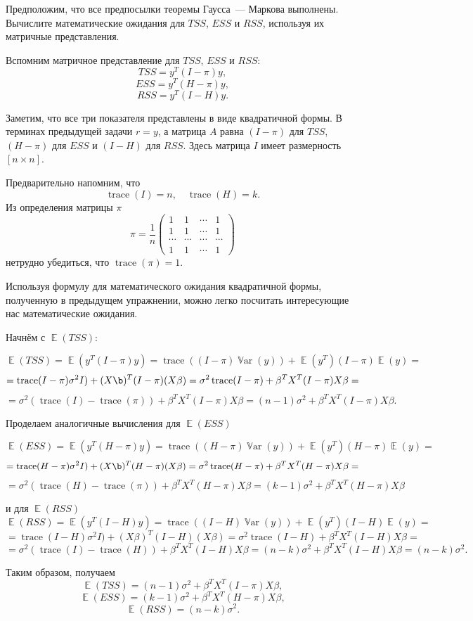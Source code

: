 \documentclass[12pt]{article}
\DeclareMathOperator{\Var}{\mathbb{V}ar}
\DeclareMathOperator{\E}{\mathbb{E}}
\DeclareMathOperator{\trace}{trace}
\newcommand{\RSS}{RSS}
\newcommand{\ESS}{ESS}
\newcommand{\TSS}{TSS}
\begin{document}
\begin{problem}
Предположим, что все предпосылки теоремы Гаусса~— Маркова выполнены. 
Вычислите математические ожидания для $\TSS$, $\ESS$ и $\RSS$, используя их матричные представления.
\begin{sol}
    Вспомним матричное представление для $\TSS$, $\ESS$ и $\RSS$:
    \[
\TSS = y^{T}(I - \pi)y,
\]
\[
\ESS = y^{T}(H - \pi)y,
\]
\[
\RSS = y^{T}(I - H)y.
\]

Заметим, что все три показателя представлены в виде квадратичной формы. В терминах предыдущей задачи $r = y$, а матрица $A$ равна $(I - \pi)$ для $TSS$, $(H - \pi)$ для $ESS$ и $(I - H)$ для $RSS$. Здесь матрица $I$ имеет размерность $[n \times n]$.

Предварительно напомним, что
\[
\trace(I) = n, \quad \trace(H) = k.
\]
Из определения матрицы $\pi$
\[
\pi = \frac{1}{n}
 \begin{pmatrix}
  1 & 1 & \cdots & 1\\
  1 & 1 & \cdots & 1\\
  \cdots & \cdots & \cdots & \cdots \\
  1 & 1 & \cdots & 1
 \end{pmatrix}
 \]
нетрудно убедиться, что $\trace(\pi) = 1$.

Используя формулу для математического ожидания квадратичной формы, полученную в предыдущем упражнении, можно легко посчитать интересующие нас математические ожидания.

Начнём с $\E(\TSS)$:

\[
\E(\TSS) = \E(y^{T}(I - \pi)y) = \trace((I - \pi)\Var(y)) + \E(y^T)(I-\pi)\E(y) =
\]
\[
=\trace(I-\pi)\sigma^2I) + (X\b)^T(I-\pi)(X\beta) = \sigma^2\trace(I-\pi) + \beta^TX^T(I-\pi)X\beta = 
\]
\[
= \sigma^2(\trace(I)-\trace(\pi)) + \beta^TX^T(I-\pi)X\beta = (n-1)\sigma^2 + \beta^TX^T(I-\pi)X\beta.
\]

Проделаем аналогичные вычисления для $\E(ESS)$

\[
\E(\ESS) = \E(y^{T}(H - \pi)y) = \trace((H - \pi)\Var(y)) + \E(y^T)(H -\pi)\E(y) =
\]
\[
=\trace(H-\pi)\sigma^2I) + (X\b)^T(H-\pi)(X\beta) = \sigma^2\trace(H-\pi) + \beta^TX^T(H-\pi)X\beta = 
\]
\[
= \sigma^2(\trace(H)-\trace(\pi)) + \beta^TX^T(H-\pi)X\beta = (k-1)\sigma^2 + \beta^TX^T(H-\pi)X\beta
\]

и для $\E(RSS)$
\[
\E(\RSS) = \E(y^{T}(I - H)y) = \trace((I - H)\Var(y)) + \E(y^T)(I-H)\E(y) =
\]
\[
=\trace(I-H)\sigma^2I) + (X\beta)^T(I-H)(X\beta) = \sigma^2\trace(I-H) + \beta^TX^T(I-H)X\beta = 
\]
\[
= \sigma^2(\trace(I)-\trace(H)) + \beta^TX^T(I-H)X\beta = (n-k)\sigma^2 + \beta^TX^T(I-H)X\beta = (n-k)\sigma^2. 
\]

Таким образом, получаем
\[
\E(\TSS) = (n-1)\sigma^2 + \beta^TX^T(I-\pi)X\beta,
\]
\[
\E (\ESS) = (k-1)\sigma^2 + \beta^TX^T(H-\pi)X\beta,
\]
\[
\E(\RSS) = (n-k)\sigma^2.
\]
\end{sol}
\end{problem}
\end{document}
